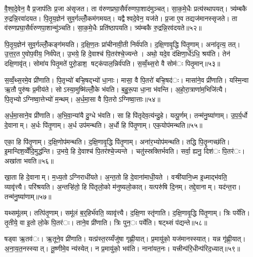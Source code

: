 
वै॒श्व॒दे॒वेन॒ वै प्र॒जाप॑तिः प्र॒जा अ॑सृजत। ता व॑रुणप्रघा॒सैर्व॑रुणपा॒शाद॑मुञ्चत्। सा॒क॒मे॒धैः प्रत्य॑स्थापयत्। त्र्य॑म्बकै रु॒द्रन्नि॒रवा॑दयत। पि॒तृ॒य॒ज्ञेन॑ सुव॒र्गल्लोँ॒कम॑गमयत्। यद्वैश्वदे॒वेन॒ यज॑ते। प्र॒जा ए॒व तद्यज॑मानस्सृजते। ता व॑रुणप्रघा॒सैर्व॑रुणपा॒शान्मु॑ञ्चति। सा॒क॒मे॒धैः प्रति॑ष्ठापयति। त्र्य॑म्बकै रु॒द्रन्नि॒रव॑दयते॥५२॥

पि॒तृ॒य॒ज्ञेन॑ सुव॒र्गल्लोँ॒कङ्ग॑मयति। द॒क्षि॒ण॒तः प्रा॑चीनावी॒ती निर्व॑पति। द॒क्षि॒णावृ॒द्धि पि॑तृ॒णाम्। अना॑दृत्य॒ तत्। उ॒त्त॒र॒त ए॒वोप॒वीय॒ निर्व॑पेत्। उ॒भये॒ हि दे॒वाश्च॑ पि॒तर॑श्चे॒ज्यन्ते। अथो॒ यदे॒व द॑क्षिणा॒र्धे॑ऽधि॒ श्रय॑ति। तेन॑ दक्षि॒णावृ॑त्। सोमा॑य पितृ॒मते॑ पुरो॒डाश॒ षट्क॑पाल॒न्निर्व॑पति। स॒व्वँ॒थ्स॒रो वै सोम॑ः पितृ॒मान्॥५३॥

स॒व्वँ॒थ्स॒रमे॒व प्री॑णाति। पि॒तृभ्यो॑ बऱ्हि॒षद्भ्यो॑ धा॒नाः। मासा॒ वै पि॒तरो॑ बऱ्हि॒षद॑ः। मासा॑ने॒व प्री॑णाति। यस्मि॒न्वा ऋ॒तौ पुरु॑षः प्र॒मीय॑ते। सोऽस्या॒मुष्मि॑ल्लोँ॒के भ॑वति। ब॒हु॒रू॒पा धा॒ना भ॑वन्ति। अ॒हो॒रा॒त्राणा॑म॒भिजि॑त्यै। पि॒तृभ्योऽग्निष्वा॒त्तेभ्यो॑ म॒न्थम्। अ॒र्ध॒मा॒सा वै पि॒तरोऽग्निष्वा॒त्ताः॥५४॥

अ॒र्ध॒मा॒साने॒व प्री॑णाति। अ॒भि॒वा॒न्या॑यै दु॒ग्धे भ॑वति। सा हि पि॑तृदेव॒त्य॑न्दु॒हे। यत्पू॒र्णम्। तन्म॑नु॒ष्या॑णाम्। उ॒प॒र्य॒र्धो दे॒वानाम्। अ॒र्धः पि॑तृ॒णाम्। अ॒र्ध उप॑मन्थति। अ॒र्धो हि पि॑तृ॒णाम्। एक॒योप॑मन्थति॥५५॥

एका॒ हि पि॑तृ॒णाम्। द॒क्षि॒णोप॑मन्थति। द॒क्षि॒णावृ॒द्धि पि॑तृ॒णाम्। अना॑र॒भ्योप॑मन्थति। तद्धि पि॒तॄन्गच्छ॑ति। इ॒मान्दिश॒व्वेँदि॒मुद्ध॑न्ति। उ॒भये॒ हि दे॒वाश्च॑ पि॒तर॑श्चे॒ज्यन्ते। चतु॑स्स्रक्तिर्भवति। सर्वा॒ ह्यनु॒ दिश॑ः पि॒तर॑ः। अखा॑ता भवति॥५६॥

खा॒ता हि दे॒वानाम्। म॒ध्य॒तोऽग्निराधी॑यते। अ॒न्त॒तो हि दे॒वाना॑माधी॒यते। वऱ्षी॑यानि॒ध्म इ॒ध्माद्भ॑वति॒ व्यावृ॑त्त्यै। परि॑श्रयति। अ॒न्तऱ्हि॑तो॒ हि पि॑तृलो॒को म॑नुष्यलो॒कात्। यत्परु॑षि दि॒नम्। तद्दे॒वानाम्। यद॑न्त॒रा। तन्म॑नु॒ष्या॑णाम्॥५७॥

यथ्समू॑लम्। तत्पि॑तृ॒णाम्। समू॑लं ब॒र्॒हिर्भ॑वति॒ व्यावृ॑त्त्यै। द॒क्षि॒णा स्तृ॑णाति। द॒क्षि॒णावृ॒द्धि पि॑तृ॒णाम्। त्रिः पर्ये॑ति। तृ॒तीये॒ वा इ॒तो लो॒के पि॒तर॑ः। ताने॒व प्री॑णाति। त्रिः पुन॒ः पर्ये॑ति। षट्थ्सं प॑द्यन्ते॥५८॥

षड्वा ऋ॒तव॑ः। ऋ॒तूने॒व प्री॑णाति। यत्प्र॑स्त॒रय्यँजु॑षा गृह्णी॒यात्। प्र॒मायु॑को॒ यज॑मानस्स्यात्। यन्न गृ॑ह्णी॒यात्। अ॒ना॒य॒त॒नस्स्यात्। तू॒ष्णीमे॒व न्य॑स्येत्। न प्र॒मायु॑को॒ भव॑ति। नाना॑यत॒नः। यत्त्रीन्प॑रि॒धीन्प॑रिद॒ध्यात्॥५९॥


